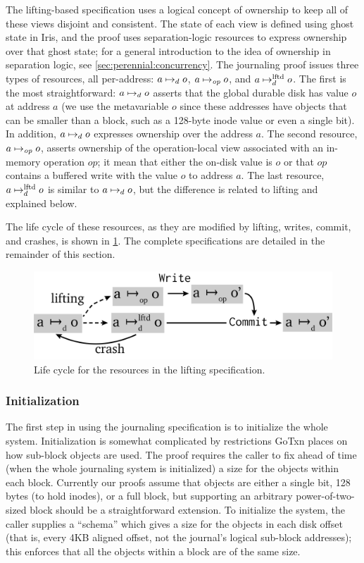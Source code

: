 The lifting-based specification uses a logical concept of ownership to keep all
of these views disjoint and consistent. The state of each view is defined using ghost state
in Iris, and the proof uses separation-logic resources to express ownership over that
ghost state; for a general introduction to the idea of
ownership in separation logic, see \cref{sec:perennial:concurrency}. The
journaling proof issues three types of resources, all per-address:
$a \mapsto_d o$, $a \mapsto_{\mathit{op}} o$, and $a \mapsto_d^{\mathrm{lftd}} o$. The first is the most
straightforward: $a \mapsto_d o$ asserts that the global durable disk has
value $o$ at address $a$ (we use the metavariable $o$ since these addresses have
objects that can be smaller than a block, such as a 128-byte inode value or even
a single bit). In addition, $a \mapsto_d o$ expresses ownership over the
address $a$. The second resource, $a \mapsto_{\mathit{op}} o$, asserts ownership of the
operation-local view associated with an in-memory operation $\mathit{op}$; it
mean that either the on-disk value is $o$ or that $\mathit{op}$ contains a
buffered write with the value $o$ to address $a$. The last resource,
$a \mapsto_d^{\mathrm{lftd}} o$ is similar to $a \mapsto_d o$, but the difference is related
to lifting and explained below.

The life cycle of these resources, as they are modified by lifting, writes,
commit, and crashes, is shown in \cref{fig:gojournal-resources}. The complete
specifications are detailed in the remainder of this section.

\begin{figure}[hb]
  \centering
  \includegraphics{fig/gojournal-resources.png}
  \caption{Life cycle for the resources in the lifting specification.}
  \label{fig:gojournal-resources}
\end{figure}


\subsubsection{Initialization}

The first step in using the journaling specification is to initialize the whole
system. Initialization is somewhat complicated by restrictions GoTxn places
on how sub-block objects are used. The proof requires the caller to fix ahead of
time (when the whole journaling system is initialized) a size for
the objects within each block. Currently our proofs assume that objects are either a single bit, 128
bytes (to hold inodes), or a full block, but supporting an arbitrary
power-of-two-sized block should be a
straightforward extension. To initialize the system, the caller supplies a
``schema'' which gives a size for the objects in each disk offset (that is, every 4KB
aligned offset, not the journal's logical sub-block addresses); this enforces
that all the objects within a block are of the same size.

